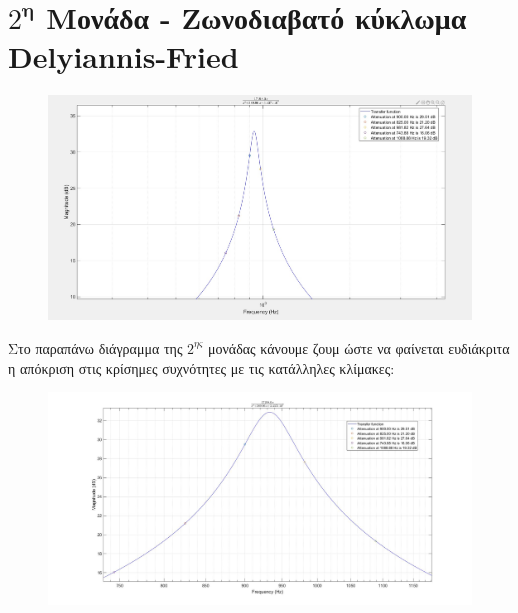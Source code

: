 \documentclass{article}
\begin{document}
{{\section*{$2^\textbf{η}$ Μονάδα - Ζωνοδιαβατό κύκλωμα Delyiannis-Fried} 
  \begin{figure}[h!]
\centering
 	\advance\leftskip-2cm
  \includegraphics[width=160mm,scale=2]{thema2/matlab1.jpg}
\end{figure} 
\normalsize{}
Στο παραπάνω διάγραμμα της $2^{ης}$ μονάδας κάνουμε ζουμ ώστε να φαίνεται ευδιάκριτα η απόκριση στις κρίσημες συχνότητες με τις κατάλληλες κλίμακες:
\large{}
  \begin{figure}[h!]
\centering
 	\advance\leftskip-1cm
  \includegraphics[width=120mm,scale=2]{thema2/z2.jpg}
\end{figure} 
\newpage
}}
\end{document}
